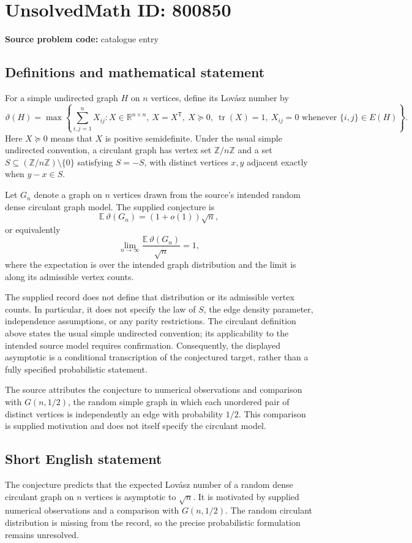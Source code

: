 \documentclass[11pt]{article}
\newcommand{\Z}{\mathbb{Z}}
\newcommand{\R}{\mathbb{R}}
\newcommand{\E}{\mathbb{E}}
\begin{document}
\section*{UnsolvedMath ID: 800850}
\textbf{Source problem code:} catalogue entry
\subsection{Definitions and mathematical statement}
For a simple undirected graph \(H\) on \(n\) vertices, define its Lov\'asz number by
\[
\vartheta(H)=\max\left\{\sum_{i,j=1}^{n}X_{ij}: X\in\R^{n\times n},\ X=X^{\mathsf T},\ X\succeq0,\ \operatorname{tr}(X)=1,\ X_{ij}=0\text{ whenever }\{i,j\}\in E(H)\right\}.
\]
Here \(X\succeq0\) means that \(X\) is positive semidefinite. Under the usual simple undirected convention, a circulant graph has vertex set \(\Z/n\Z\) and a set \(S\subseteq(\Z/n\Z)\setminus\{0\}\) satisfying \(S=-S\), with distinct vertices \(x,y\) adjacent exactly when \(y-x\in S\).

Let \(G_n\) denote a graph on \(n\) vertices drawn from the source's intended random dense circulant graph model. The supplied conjecture is
\[
\E\,\vartheta(G_n)=(1+o(1))\sqrt n,
\]
or equivalently
\[
\lim_{n\to\infty}\frac{\E\,\vartheta(G_n)}{\sqrt n}=1,
\]
where the expectation is over the intended graph distribution and the limit is along its admissible vertex counts.

The supplied record does not define that distribution or its admissible vertex counts. In particular, it does not specify the law of \(S\), the edge density parameter, independence assumptions, or any parity restrictions. The circulant definition above states the usual simple undirected convention; its applicability to the intended source model requires confirmation. Consequently, the displayed asymptotic is a conditional transcription of the conjectured target, rather than a fully specified probabilistic statement.

The source attributes the conjecture to numerical observations and comparison with \(G(n,1/2)\), the random simple graph in which each unordered pair of distinct vertices is independently an edge with probability \(1/2\). This comparison is supplied motivation and does not itself specify the circulant model.
\subsection{Short English statement}
The conjecture predicts that the expected Lov\'asz number of a random dense circulant graph on \(n\) vertices is asymptotic to \(\sqrt n\). It is motivated by supplied numerical observations and a comparison with \(G(n,1/2)\). The random circulant distribution is missing from the record, so the precise probabilistic formulation remains unresolved.
\end{document}
